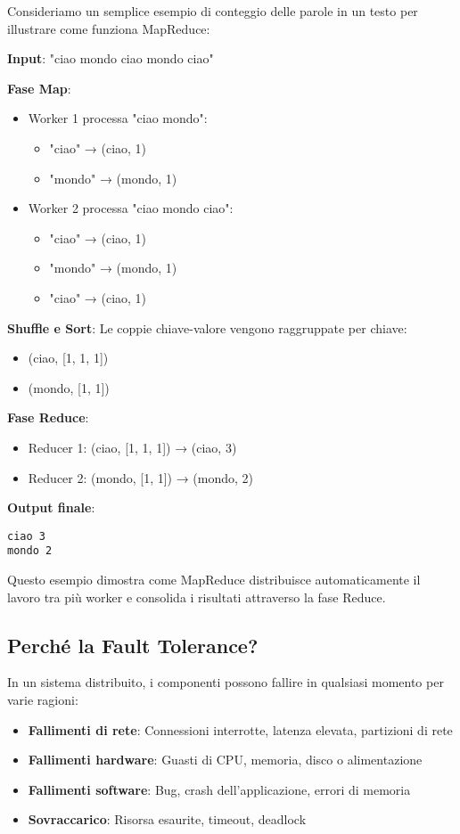 \documentclass[12pt,a4paper]{article}
\begin{document}
Consideriamo un semplice esempio di conteggio delle parole in un testo per illustrare come funziona MapReduce:

\textbf{Input}: "ciao mondo ciao mondo ciao"

\textbf{Fase Map}:
\begin{itemize}
\item Worker 1 processa "ciao mondo": 
  \begin{itemize}
  \item "ciao" → (ciao, 1)
  \item "mondo" → (mondo, 1)
  \end{itemize}
\item Worker 2 processa "ciao mondo ciao":
  \begin{itemize}
  \item "ciao" → (ciao, 1)
  \item "mondo" → (mondo, 1)
  \item "ciao" → (ciao, 1)
  \end{itemize}
\end{itemize}

\textbf{Shuffle e Sort}: Le coppie chiave-valore vengono raggruppate per chiave:
\begin{itemize}
\item (ciao, [1, 1, 1])
\item (mondo, [1, 1])
\end{itemize}

\textbf{Fase Reduce}:
\begin{itemize}
\item Reducer 1: (ciao, [1, 1, 1]) → (ciao, 3)
\item Reducer 2: (mondo, [1, 1]) → (mondo, 2)
\end{itemize}

\textbf{Output finale}: 
\begin{verbatim}
ciao 3
mondo 2
\end{verbatim}

Questo esempio dimostra come MapReduce distribuisce automaticamente il lavoro tra più worker e consolida i risultati attraverso la fase Reduce.

\subsection{Perché la Fault Tolerance?}

In un sistema distribuito, i componenti possono fallire in qualsiasi momento per varie ragioni:

\begin{itemize}
\item \textbf{Fallimenti di rete}: Connessioni interrotte, latenza elevata, partizioni di rete
\item \textbf{Fallimenti hardware}: Guasti di CPU, memoria, disco o alimentazione
\item \textbf{Fallimenti software}: Bug, crash dell'applicazione, errori di memoria
\item \textbf{Sovraccarico}: Risorsa esaurite, timeout, deadlock
\end{itemize}
\end{document}
